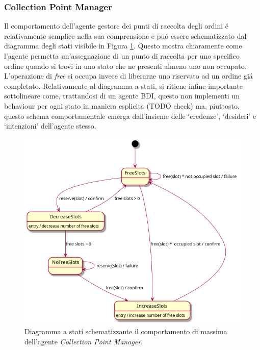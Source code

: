 \subsubsection{Collection Point Manager}
Il comportamento dell'agente gestore dei punti di raccolta degli ordini \'e relativamente semplice nella sua comprensione e pu\'o essere schematizzato dal diagramma degli stati visibile in Figura \ref{fig:state-diagram-cpm}. Questo mostra chiaramente come l'agente permetta un'assegnazione di un punto di raccolta per uno specifico ordine quando si trovi in uno stato che ne presenti almeno uno non occupato. L'operazione di \textit{free} si occupa invece di liberarne uno riservato ad un ordine gi\'a completato.%
\parag
Relativamente al diagramma a stati, si ritiene infine importante sottolineare come, trattandosi di un agente BDI, questo non implementi un behaviour per ogni stato in maniera esplicita (TODO check) ma, piuttosto, questo schema comportamentale emerga dall'insieme delle `credenze', `desideri' e `intenzioni' dell'agente stesso.
\begin{figure}
    \includegraphics[width=\textwidth]{section/design/figure/collection_point_manager/state_diagram.png}
    \caption{Diagramma a stati schematizzante il comportamento di massima dell'agente \textit{Collection Point Manager}.}
    \label{fig:state-diagram-cpm}
\end{figure}

